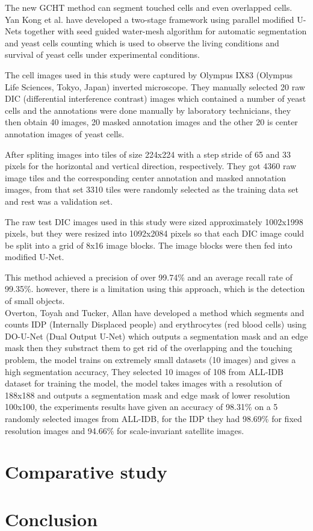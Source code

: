 The new GCHT method can segment touched cells and even overlapped cells.\\

Yan Kong et al. \textsuperscript{\cite{Kong:20}} have developed a two-stage framework using parallel modified U-Nets together with seed guided water-mesh algorithm for automatic segmentation and yeast cells counting which is used to observe the living conditions and survival of yeast cells under experimental conditions.

The cell images used in this study were captured by Olympus IX83 (Olympus Life Sciences, Tokyo, Japan) inverted microscope. They manually selected 20 raw DIC (differential interference contrast) images which contained a number of yeast cells and the annotations were done manually by laboratory technicians, they then obtain 40 images, 20 masked annotation images and the other 20 is center annotation images of yeast cells.

After spliting images into tiles of size 224x224 with a step stride of 65 and 33 pixels for the horizontal and vertical direction, respectively. They got 4360 raw image tiles and the corresponding center annotation and masked annotation images, from that set 3310 tiles were randomly selected as the training data set and rest was a validation set.

The raw test DIC images used in this study were sized approximately 1002x1998 pixels, but they were resized into 1092x2084 pixels so that each DIC image could be split into a grid of 8x16 image blocks. The image blocks were then fed into modified U-Net.

This method achieved a precision of over 99.74\% and an average recall rate of 99.35\%. however, there is a limitation using this approach, which is the detection of small objects.\\

Overton, Toyah and Tucker, Allan \textsuperscript{\cite{10.1007/978-3-030-44584-3_31}} have developed a method which segments and counts IDP (Internally Displaced people) and erythrocytes (red blood cells) using DO-U-Net (Dual Output U-Net) which outputs a segmentation mask and an edge mask then they substract them to get rid of the overlapping and the touching problem, the model trains on extremely small datasets (10 images) and gives a high segmentation accuracy, They selected 10 images of 108 from ALL-IDB dataset for training the model, the model takes images with a resolution of 188x188 and outputs a segmentation mask and edge mask of lower resolution 100x100, the experiments results have given an accuracy of 98.31\% on a 5 randomly selected images from ALL-IDB, for the IDP they had 98.69\% for fixed resolution images and 94.66\% for scale-invariant satellite images.\\

\section{Comparative study}



\section{Conclusion}
\vspace{0.1in}
\hspace*{0.16in}
